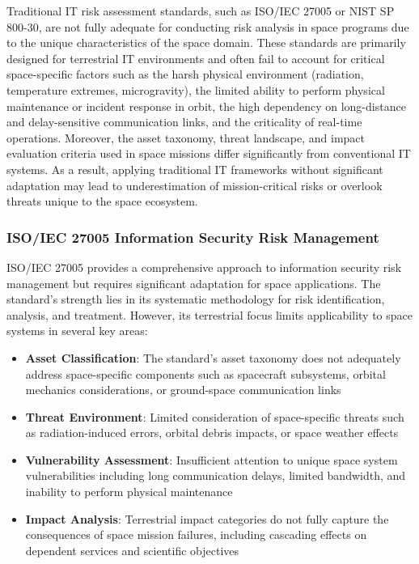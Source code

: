 \documentclass[binding=0.6cm]{sapthesis}
\begin{document}
Traditional IT risk assessment standards, such as ISO/IEC 27005 or NIST SP 800-30, are not fully adequate for conducting risk analysis in space programs due to the unique characteristics of the space domain. These standards are primarily designed for terrestrial IT environments and often fail to account for critical space-specific factors such as the harsh physical environment (radiation, temperature extremes, microgravity), the limited ability to perform physical maintenance or incident response in orbit, the high dependency on long-distance and delay-sensitive communication links, and the criticality of real-time operations. Moreover, the asset taxonomy, threat landscape, and impact evaluation criteria used in space missions differ significantly from conventional IT systems. As a result, applying traditional IT frameworks without significant adaptation may lead to underestimation of mission-critical risks or overlook threats unique to the space ecosystem.

\subsubsection{ISO/IEC 27005 Information Security Risk Management}

ISO/IEC 27005 provides a comprehensive approach to information security risk management but requires significant adaptation for space applications. The standard's strength lies in its systematic methodology for risk identification, analysis, and treatment. However, its terrestrial focus limits applicability to space systems in several key areas:

\begin{itemize}
    \item \textbf{Asset Classification}: The standard's asset taxonomy does not adequately address space-specific components such as spacecraft subsystems, orbital mechanics considerations, or ground-space communication links
    \item \textbf{Threat Environment}: Limited consideration of space-specific threats such as radiation-induced errors, orbital debris impacts, or space weather effects
    \item \textbf{Vulnerability Assessment}: Insufficient attention to unique space system vulnerabilities including long communication delays, limited bandwidth, and inability to perform physical maintenance
    \item \textbf{Impact Analysis}: Terrestrial impact categories do not fully capture the consequences of space mission failures, including cascading effects on dependent services and scientific objectives
\end{itemize}
\end{document}
